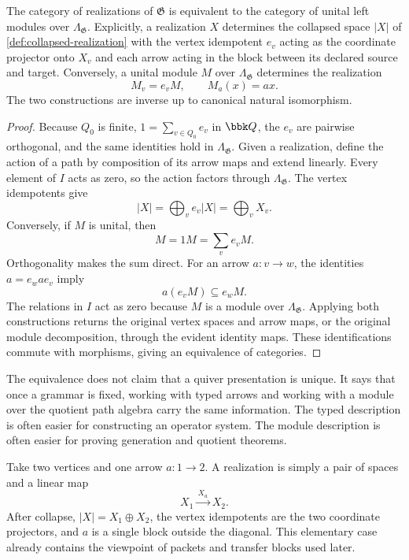 \begin{theorem}
\label{thm:typed-module-equivalence}
The category of realizations of $\mathfrak G$ is equivalent to the category of unital left modules over $\Lambda_{\mathfrak G}$.  Explicitly, a realization $X$ determines the collapsed space $|X|$ of \cref{def:collapsed-realization}
with the vertex idempotent $e_v$ acting as the coordinate projector onto $X_v$ and each arrow acting in the block between its declared source and target.  Conversely, a unital module $M$ over $\Lambda_{\mathfrak G}$ determines the realization
\[
M_v=e_vM,
\qquad
M_a(x)=ax.
\]
The two constructions are inverse up to canonical natural isomorphism.
\end{theorem}

\begin{proof}
Because $Q_0$ is finite, $1=\sum_{v\in Q_0}e_v$ in $\bbk Q$, the $e_v$ are pairwise orthogonal, and the same identities hold in $\Lambda_{\mathfrak G}$.  Given a realization, define the action of a path by composition of its arrow maps and extend linearly.  Every element of $I$ acts as zero, so the action factors through $\Lambda_{\mathfrak G}$.  The vertex idempotents give
\[
|X|=\bigoplus_v e_v|X|=\bigoplus_vX_v.
\]
Conversely, if $M$ is unital, then
\[
M=1M=\sum_ve_vM.
\]
Orthogonality makes the sum direct.  For an arrow $a:v\to w$, the identities $a=e_wae_v$ imply
\[
a(e_vM)\subseteq e_wM.
\]
The relations in $I$ act as zero because $M$ is a module over $\Lambda_{\mathfrak G}$.  Applying both constructions returns the original vertex spaces and arrow maps, or the original module decomposition, through the evident identity maps.  These identifications commute with morphisms, giving an equivalence of categories.
\end{proof}

\begin{interpretation}
The equivalence does not claim that a quiver presentation is unique.  It says that once a grammar is fixed, working with typed arrows and working with a module over the quotient path algebra carry the same information.  The typed description is often easier for constructing an operator system.  The module description is often easier for proving generation and quotient theorems.
\end{interpretation}

\begin{microexample}[title={A grammar with two vertices}]
Take two vertices and one arrow \(a:1\to2\).  A realization is simply a pair of spaces and a linear map
\[
X_1\xrightarrow{\,X_a\,}X_2.
\]
After collapse, \(|X|=X_1\oplus X_2\), the vertex idempotents are the two coordinate projectors, and \(a\) is a single block outside the diagonal.  This elementary case already contains the viewpoint of packets and transfer blocks used later.
\end{microexample}


